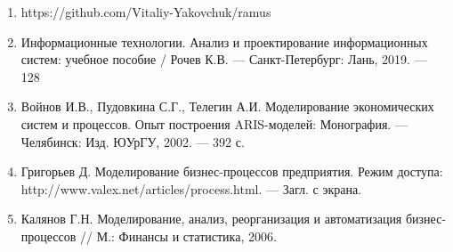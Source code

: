 \documentclass[a4paper,14pt]{extarticle}
\begin{document}
\newpage


\begin{enumerate}
	\item https://github.com/Vitaliy-Yakovchuk/ramus
	\item Информационные технологии. Анализ и проектирование информационных систем: учебное пособие / Рочев К.В. --- Санкт-Петербург: Лань, 2019. --- 128

	
	\item Войнов И.В., Пудовкина С.Г., Телегин А.И. Моделирование экономических систем и процессов. Опыт построения ARIS-моделей: Монография. --- Челябинск: Изд. ЮУрГУ, 2002. --- 392 с.
	
	
	\item Григорьев Д. Моделирование бизнес-процессов предприятия. Режим доступа: http://www.valex.net/articles/process.html. --- Загл. с экрана.
	
	\item Калянов Г.Н. Моделирование, анализ, реорганизация и автоматизация бизнес-процессов // М.: Финансы и статистика, 2006.
\end{enumerate}


\end{document}
